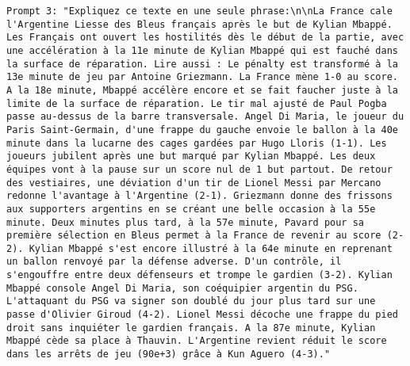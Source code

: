 \begin{lstlisting}[label=lst:judge_summar_instances,caption={Example of prompts for paraphrasing in English and French.}]
Prompt 3: "Expliquez ce texte en une seule phrase:\n\nLa France cale l'Argentine Liesse des Bleus français après le but de Kylian Mbappé. Les Français ont ouvert les hostilités dès le début de la partie, avec une accélération à la 11e minute de Kylian Mbappé qui est fauché dans la surface de réparation. Lire aussi : Le pénalty est transformé à la 13e minute de jeu par Antoine Griezmann. La France mène 1-0 au score. A la 18e minute, Mbappé accélère encore et se fait faucher juste à la limite de la surface de réparation. Le tir mal ajusté de Paul Pogba passe au-dessus de la barre transversale. Angel Di Maria, le joueur du Paris Saint-Germain, d'une frappe du gauche envoie le ballon à la 40e minute dans la lucarne des cages gardées par Hugo Lloris (1-1). Les joueurs jubilent après une but marqué par Kylian Mbappé. Les deux équipes vont à la pause sur un score nul de 1 but partout. De retour des vestiaires, une déviation d'un tir de Lionel Messi par Mercano redonne l'avantage à l'Argentine (2-1). Griezmann donne des frissons aux supporters argentins en se créant une belle occasion à la 55e minute. Deux minutes plus tard, à la 57e minute, Pavard pour sa première sélection en Bleus permet à la France de revenir au score (2-2). Kylian Mbappé s'est encore illustré à la 64e minute en reprenant un ballon renvoyé par la défense adverse. D'un contrôle, il s'engouffre entre deux défenseurs et trompe le gardien (3-2). Kylian Mbappé console Angel Di Maria, son coéquipier argentin du PSG. L'attaquant du PSG va signer son doublé du jour plus tard sur une passe d'Olivier Giroud (4-2). Lionel Messi décoche une frappe du pied droit sans inquiéter le gardien français. A la 87e minute, Kylian Mbappé cède sa place à Thauvin. L'Argentine revient réduit le score dans les arrêts de jeu (90e+3) grâce à Kun Aguero (4-3)."
\end{lstlisting}